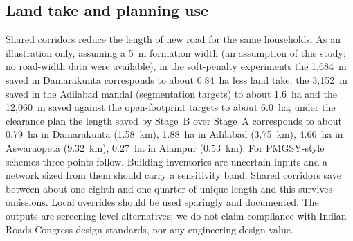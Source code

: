 \documentclass[12pt,a4paper]{article}
\begin{document}
\subsection{Land take and planning use}
Shared corridors reduce the length of new road for the same households. As an illustration only, assuming a 5~m formation width (an assumption of this study; no road-width data were available), in the soft-penalty experiments the 1{,}684~m saved in Damarakunta corresponds to about 0.84~ha less land take, the 3{,}152~m saved in the Adilabad mandal (segmentation targets) to about 1.6~ha and the 12{,}060~m saved against the open-footprint targets to about 6.0~ha; under the clearance plan the length saved by Stage~B over Stage~A corresponds to about 0.79~ha in Damarakunta (1.58~km), 1.88~ha in Adilabad (3.75~km), 4.66~ha in Aswaraopeta (9.32~km), 0.27~ha in Alampur (0.53~km). For PMGSY-style schemes \cite{pmgsy} three points follow. Building inventories are uncertain inputs and a network sized from them should carry a sensitivity band. Shared corridors save between about one eighth and one quarter of unique length and this survives omissions. Local overrides should be used sparingly and documented. The outputs are screening-level alternatives; we do not claim compliance with Indian Roads Congress design standards, nor any engineering design value.
\end{document}
